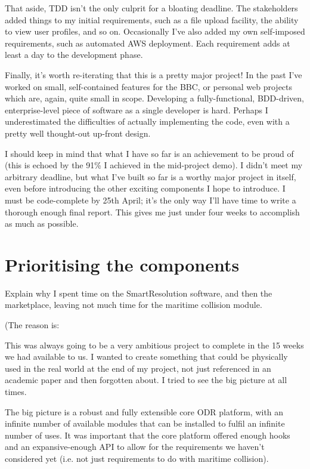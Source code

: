 That aside, TDD isn't the only culprit for a bloating deadline. The stakeholders added things to my initial requirements, such as a file upload facility, the ability to view user profiles, and so on. Occasionally I've also added my own self-imposed requirements, such as automated AWS deployment. Each requirement adds at least a day to the development phase.

Finally, it's worth re-iterating that this is a pretty major project! In the past I've worked on small, self-contained features for the BBC, or personal web projects which are, again, quite small in scope. Developing a fully-functional, BDD-driven, enterprise-level piece of software as a single developer is hard. Perhaps I underestimated the difficulties of actually implementing the code, even with a pretty well thought-out up-front design.

I should keep in mind that what I have so far is an achievement to be proud of (this is echoed by the 91\% I achieved in the mid-project demo). I didn't meet my arbitrary deadline, but what I've built so far is a worthy major project in itself, even before introducing the other exciting components I hope to introduce. I must be code-complete by 25th April; it's the only way I'll have time to write a thorough enough final report. This gives me just under four weeks to accomplish as much as possible.

\section{Prioritising the components}

Explain why I spent time on the SmartResolution software, and then the marketplace, leaving not much time for the maritime collision module.

(The reason is:

This was always going to be a very ambitious project to complete in the 15 weeks we had available to us. I wanted to create something that could be physically used in the real world at the end of my project, not just referenced in an academic paper and then forgotten about. I tried to see the big picture at all times.

The big picture is a robust and fully extensible core ODR platform, with an infinite number of available modules that can be installed to fulfil an infinite number of uses. It was important that the core platform offered enough hooks and an expansive-enough API to allow for the requirements we haven't considered yet (i.e. not just requirements to do with maritime collision).

